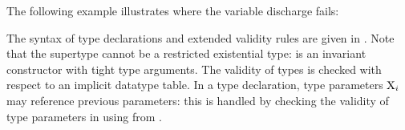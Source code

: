 The following example illustrates  where
the variable discharge fails:\\

The syntax of type declarations and extended validity rules
are given in .
Note that the supertype cannot be a restricted existential type:
 is an invariant constructor with
tight type arguments.
The validity of types is checked with respect to an implicit datatype table.
In a type declaration, type parameters $\mathrm{X}_i$ may reference previous
parameters: this is handled by checking the validity of type parameters
in \tyvld{\TyTable}{\tydecl} using \tyvld{}{\AEnv} from
.

